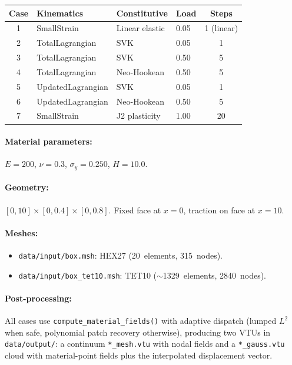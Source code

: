 \begin{center}
\renewcommand{\arraystretch}{1.15}
\begin{tabular}{clllc}
  \toprule
  Case & Kinematics & Constitutive & Load & Steps \\
  \midrule
  1 & SmallStrain      & Linear elastic  & 0.05 & 1 (linear) \\
  2 & TotalLagrangian  & SVK             & 0.05 & 1 \\
  3 & TotalLagrangian  & SVK             & 0.50 & 5 \\
  4 & TotalLagrangian  & Neo-Hookean     & 0.50 & 5 \\
  5 & UpdatedLagrangian & SVK            & 0.05 & 1 \\
  6 & UpdatedLagrangian & Neo-Hookean    & 0.50 & 5 \\
  7 & SmallStrain      & J2 plasticity   & 1.00 & 20 \\
  \bottomrule
\end{tabular}
\end{center}

\paragraph{Material parameters:}
$E = 200$, $\nu = 0.3$, $\sigma_y = 0.250$, $H = 10.0$.

\paragraph{Geometry:}
$[0, 10] \times [0, 0.4] \times [0, 0.8]$.
Fixed face at $x = 0$, traction on face at $x = 10$.

\paragraph{Meshes:}
\begin{itemize}[nosep]
  \item \texttt{data/input/box.msh}: HEX27 (20~elements, 315~nodes).
  \item \texttt{data/input/box\_tet10.msh}: TET10 ($\sim$1329~elements,
        2840~nodes).
\end{itemize}

\paragraph{Post-processing:}
All cases use \texttt{compute\_material\_fields()} with adaptive dispatch
(lumped $L^2$ when safe, polynomial patch recovery otherwise), producing two
VTUs in \texttt{data/output/}: a continuum \texttt{*\_mesh.vtu} with nodal
fields and a \texttt{*\_gauss.vtu} cloud with material-point fields plus the
interpolated displacement vector.


